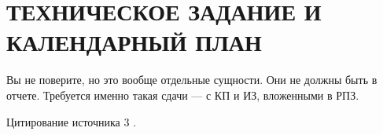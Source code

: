 \section{ТЕХНИЧЕСКОЕ ЗАДАНИЕ И КАЛЕНДАРНЫЙ ПЛАН}

Вы не поверите, но это вообще отдельные сущности. Они не должны быть
в отчете. Требуется именно такая сдачи --- с КП и ИЗ, вложенными в РПЗ.

Цитирование источника 3 \cite{Wikipedia3}.
